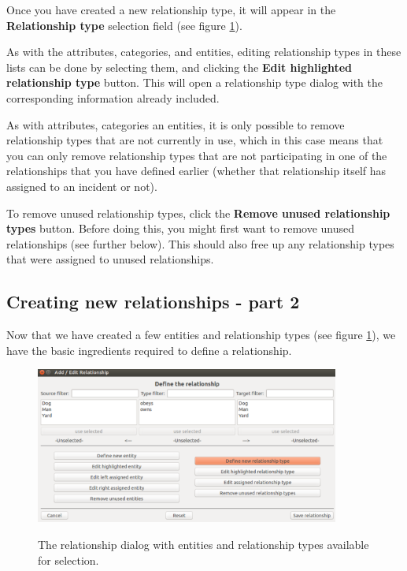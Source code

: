 \documentclass{memoir}
\begin{document}
Once you have created a new relationship type, it will appear in the \textbf{Relationship type} selection field (see figure \ref{fig:relationshipdialog2}).

As with the attributes, categories, and entities, editing relationship types in these lists can be done by selecting them, and clicking the \textbf{Edit highlighted relationship type} button. This will open a relationship type dialog with the corresponding information already included. 

As with attributes, categories an entities, it is only possible to remove relationship types that are not currently in use, which in this case means that you can only remove relationship types that are not participating in one of the relationships that you have defined earlier (whether that relationship itself has assigned to an incident or not).

To remove unused relationship types, click the \textbf{Remove unused relationship types} button. Before doing this, you might first want to remove unused relationships (see further below). This should also free up any relationship types that were assigned to unused relationships.

\subsection{Creating new relationships - part 2}
\label{sec:creatingnewrelationships2}

Now that we have created a few entities and relationship types (see figure \ref{fig:relationshipdialog2}), we have the basic ingredients required to define a relationship.

\begin{figure}[h!]
  \centering
  \caption{The relationship dialog with entities and relationship types available for selection.}
  \includegraphics[width=100mm]{Screenshot_18.pdf}
  \label{fig:relationshipdialog2}
\end{figure}
\end{document}
